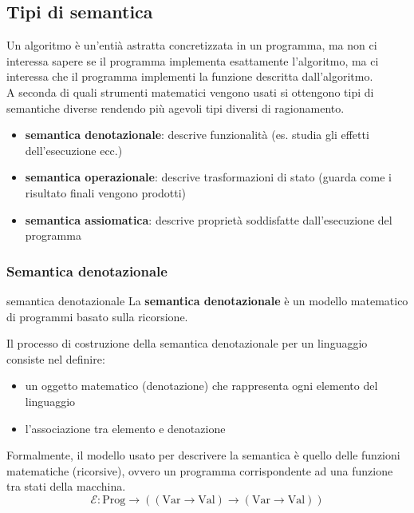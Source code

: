 \subsection{Tipi di semantica}
Un algoritmo è un'entià astratta concretizzata in un programma, ma non ci interessa sapere se il programma implementa esattamente l'algoritmo, ma ci interessa che il programma implementi la funzione descritta dall'algoritmo.\\[0.2ex]
A seconda di quali strumenti matematici vengono usati si ottengono tipi di semantiche diverse rendendo più agevoli tipi diversi di ragionamento.
\begin{itemize}[label=$\triangleright$, itemsep=\smallskipamount]
    \item \textbf{semantica denotazionale}: descrive funzionalità (es. studia gli effetti dell'esecuzione ecc.)
    \item \textbf{semantica operazionale}: descrive trasformazioni di stato (guarda come i risultato finali vengono prodotti)
    \item \textbf{semantica assiomatica}: descrive proprietà soddisfatte dall'esecuzione del programma 
\end{itemize}

\subsubsection{Semantica denotazionale}
\begin{mydef}{semantica denotazionale}
    La \textbf{semantica denotazionale} è un modello matematico di programmi basato sulla ricorsione.
\end{mydef}

Il processo di costruzione della semantica denotazionale per un linguaggio consiste nel definire:
\begin{itemize}[label=$\diamond$, itemsep=\smallskipamount]
    \item un oggetto matematico (denotazione) che rappresenta ogni elemento del linguaggio
    \item l'associazione tra elemento e denotazione
\end{itemize}

Formalmente, il modello usato per descrivere la semantica è quello delle funzioni matematiche (ricorsive), ovvero un programma  corrispondente ad una funzione tra stati della macchina.
\[
    \mathcal{E}: \mathrm{Prog} \rightarrow ((\mathrm{Var} \rightarrow \mathrm{Val}) \rightarrow (\mathrm{Var} \rightarrow \mathrm{Val})) 
\]

